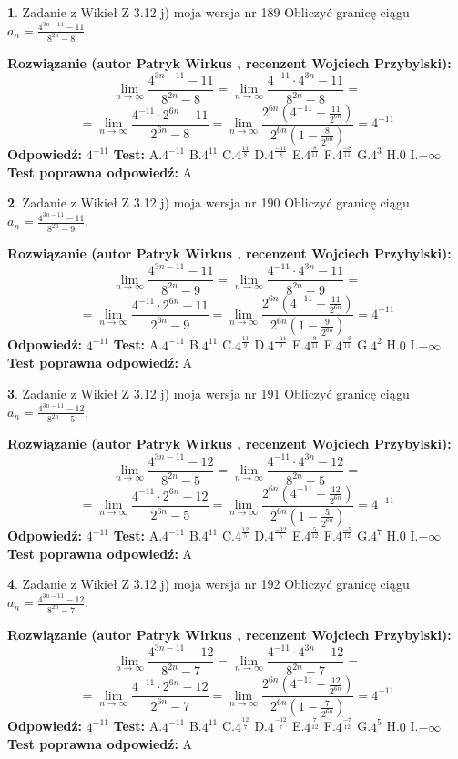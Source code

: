 \documentclass[12pt, a4paper]{article}
\theoremstyle{definition} %
\newtheorem{zad}{}
\newcommand{\zadStart}[1]{\begin{zad}#1\newline}
\newcommand{\zadStop}{\end{zad}}
\newcommand{\rozwStart}[2]{\noindent \textbf{Rozwiązanie (autor #1 , recenzent #2): }\newline}
\newcommand{\rozwStop}{\newline}
\newcommand{\odpStart}{\noindent \textbf{Odpowiedź:}\newline}
\newcommand{\odpStop}{\newline}
\newcommand{\testStart}{\noindent \textbf{Test:}\newline}
\newcommand{\testStop}{\newline}
\newcommand{\kluczStart}{\noindent \textbf{Test poprawna odpowiedź:}\newline}
\newcommand{\kluczStop}{\newline}
\begin{document}
\zadStart{Zadanie z Wikieł Z 3.12 j) moja wersja nr 189}
Obliczyć granicę ciągu $a_{n}=\frac{4^{3n-11}-11}{8^{2n}-8}$.
\zadStop
\rozwStart{Patryk Wirkus}{Wojciech Przybylski}
$$\lim\limits_{n\to\infty}\frac{4^{3n-11}-11}{8^{2n}-8}= \lim\limits_{n\to\infty}\frac{4^{-11} \cdot 4^{3n}-11}{8^{2n}-8}=$$
$$= \lim\limits_{n\to\infty}\frac{4^{-11} \cdot 2^{6n}-11}{2^{6n}-8}= \lim\limits_{n\to\infty}\frac{2^{6n}(4^{-11} - \frac{11}{2^{6n}})}{2^{6n}(1-\frac{8}{2^{6n}})}= 4^{-11}$$
\rozwStop
\odpStart
$4^{-11}$
\odpStop
\testStart
A.$4^{-11}$
B.$4^{11}$
C.$4^{\frac{11}{8}}$
D.$4^{\frac{-11}{8}}$
E.$4^{\frac{8}{11}}$
F.$4^{\frac{-8}{11}}$
G.$4^{3}$
H.$0$
I.$-\infty$
\testStop
\kluczStart
A
\kluczStop



\zadStart{Zadanie z Wikieł Z 3.12 j) moja wersja nr 190}
Obliczyć granicę ciągu $a_{n}=\frac{4^{3n-11}-11}{8^{2n}-9}$.
\zadStop
\rozwStart{Patryk Wirkus}{Wojciech Przybylski}
$$\lim\limits_{n\to\infty}\frac{4^{3n-11}-11}{8^{2n}-9}= \lim\limits_{n\to\infty}\frac{4^{-11} \cdot 4^{3n}-11}{8^{2n}-9}=$$
$$= \lim\limits_{n\to\infty}\frac{4^{-11} \cdot 2^{6n}-11}{2^{6n}-9}= \lim\limits_{n\to\infty}\frac{2^{6n}(4^{-11} - \frac{11}{2^{6n}})}{2^{6n}(1-\frac{9}{2^{6n}})}= 4^{-11}$$
\rozwStop
\odpStart
$4^{-11}$
\odpStop
\testStart
A.$4^{-11}$
B.$4^{11}$
C.$4^{\frac{11}{9}}$
D.$4^{\frac{-11}{9}}$
E.$4^{\frac{9}{11}}$
F.$4^{\frac{-9}{11}}$
G.$4^{2}$
H.$0$
I.$-\infty$
\testStop
\kluczStart
A
\kluczStop



\zadStart{Zadanie z Wikieł Z 3.12 j) moja wersja nr 191}
Obliczyć granicę ciągu $a_{n}=\frac{4^{3n-11}-12}{8^{2n}-5}$.
\zadStop
\rozwStart{Patryk Wirkus}{Wojciech Przybylski}
$$\lim\limits_{n\to\infty}\frac{4^{3n-11}-12}{8^{2n}-5}= \lim\limits_{n\to\infty}\frac{4^{-11} \cdot 4^{3n}-12}{8^{2n}-5}=$$
$$= \lim\limits_{n\to\infty}\frac{4^{-11} \cdot 2^{6n}-12}{2^{6n}-5}= \lim\limits_{n\to\infty}\frac{2^{6n}(4^{-11} - \frac{12}{2^{6n}})}{2^{6n}(1-\frac{5}{2^{6n}})}= 4^{-11}$$
\rozwStop
\odpStart
$4^{-11}$
\odpStop
\testStart
A.$4^{-11}$
B.$4^{11}$
C.$4^{\frac{12}{5}}$
D.$4^{\frac{-12}{5}}$
E.$4^{\frac{5}{12}}$
F.$4^{\frac{-5}{12}}$
G.$4^{7}$
H.$0$
I.$-\infty$
\testStop
\kluczStart
A
\kluczStop



\zadStart{Zadanie z Wikieł Z 3.12 j) moja wersja nr 192}
Obliczyć granicę ciągu $a_{n}=\frac{4^{3n-11}-12}{8^{2n}-7}$.
\zadStop
\rozwStart{Patryk Wirkus}{Wojciech Przybylski}
$$\lim\limits_{n\to\infty}\frac{4^{3n-11}-12}{8^{2n}-7}= \lim\limits_{n\to\infty}\frac{4^{-11} \cdot 4^{3n}-12}{8^{2n}-7}=$$
$$= \lim\limits_{n\to\infty}\frac{4^{-11} \cdot 2^{6n}-12}{2^{6n}-7}= \lim\limits_{n\to\infty}\frac{2^{6n}(4^{-11} - \frac{12}{2^{6n}})}{2^{6n}(1-\frac{7}{2^{6n}})}= 4^{-11}$$
\rozwStop
\odpStart
$4^{-11}$
\odpStop
\testStart
A.$4^{-11}$
B.$4^{11}$
C.$4^{\frac{12}{7}}$
D.$4^{\frac{-12}{7}}$
E.$4^{\frac{7}{12}}$
F.$4^{\frac{-7}{12}}$
G.$4^{5}$
H.$0$
I.$-\infty$
\testStop
\kluczStart
A
\kluczStop
\end{document}
